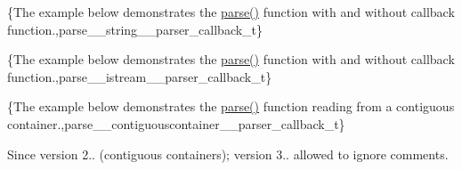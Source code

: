 \{The example below demonstrates the {\ttfamily \hyperlink{classnlohmann_1_1basic__json_a15018ade392a844ea32d5188d1a0b9c6}{parse()}} function with and without callback function.,parse\+\_\+\+\_\+string\+\_\+\+\_\+parser\+\_\+callback\+\_\+t\}

\{The example below demonstrates the {\ttfamily \hyperlink{classnlohmann_1_1basic__json_a15018ade392a844ea32d5188d1a0b9c6}{parse()}} function with and without callback function.,parse\+\_\+\+\_\+istream\+\_\+\+\_\+parser\+\_\+callback\+\_\+t\}

\{The example below demonstrates the {\ttfamily \hyperlink{classnlohmann_1_1basic__json_a15018ade392a844ea32d5188d1a0b9c6}{parse()}} function reading from a contiguous container.,parse\+\_\+\+\_\+contiguouscontainer\+\_\+\+\_\+parser\+\_\+callback\+\_\+t\}

\begin{DoxySince}{Since}
version 2.. (contiguous containers); version 3.. allowed to ignore comments. 
\end{DoxySince}
